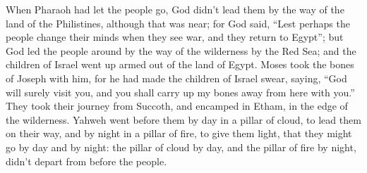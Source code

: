 {\par }{\PP {}When Pharaoh had let the people go, God didn’t lead them by the way of the land of the Philistines, although that was near; for God said, “Lest perhaps the people change their minds when they see war, and they return to Egypt”;
but God led the people around by the way of the wilderness by the Red Sea; and the children of Israel went up armed out of the land of Egypt.
Moses took the bones of Joseph with him, for he had made the children of Israel swear, saying, “God will surely visit you, and you shall carry up my bones away from here with you.”
They took their journey from Succoth, and encamped in Etham, in the edge of the wilderness.
Yahweh went before them by day in a pillar of cloud, to lead them on their way, and by night in a pillar of fire, to give them light, that they might go by day and by night:
the pillar of cloud by day, and the pillar of fire by night, didn’t depart from before the people.

}
